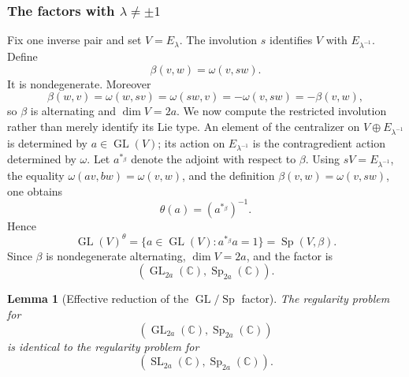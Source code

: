 \documentclass[11pt,reqno]{amsart}
\numberwithin{equation}{section}
\newtheorem{lemma}[theorem]{Lemma}
\theoremstyle{definition}
\theoremstyle{remark}
\newcommand{\C}{\mathbb C}
\newcommand{\GL}{\operatorname{GL}}
\newcommand{\SL}{\operatorname{SL}}
\newcommand{\Sp}{\operatorname{Sp}}
\begin{document}
\subsubsection{The factors with \texorpdfstring{\(\lambda\neq\pm1\)}{lambda not equal to +/-1}}

Fix one inverse pair and set \(V=E_\lambda\).  The involution \(s\)
identifies \(V\) with \(E_{\lambda^{-1}}\).  Define
\[
\beta(v,w)=\omega(v,sw).
\]
It is nondegenerate.  Moreover
\[
\beta(w,v)
=
\omega(w,sv)
=
\omega(sw,v)
=
-\omega(v,sw)
=
-\beta(v,w),
\]
so \(\beta\) is alternating and \(\dim V=2a\).
We now compute the restricted involution rather than merely identify its
Lie type.  An element of the centralizer on
\(V\oplus E_{\lambda^{-1}}\) is determined by \(a\in\GL(V)\); its action
on \(E_{\lambda^{-1}}\) is the contragredient action determined by
\(\omega\).  Let \(a^{*_{\beta}}\) denote the adjoint with respect to
\(\beta\).  Using \(sV=E_{\lambda^{-1}}\), the equality
\(\omega(av,bw)=\omega(v,w)\), and the definition
\(\beta(v,w)=\omega(v,sw)\), one obtains
\[
  \theta(a)=(a^{*_{\beta}})^{-1}.
\]
Hence
\[
  \GL(V)^\theta
  =\{a\in\GL(V):a^{*_{\beta}}a=1\}
  =\Sp(V,\beta).
\]
Since \(\beta\) is nondegenerate alternating, \(\dim V=2a\), and the
factor is
\[
  (\GL_{2a}(\C),\Sp_{2a}(\C)).
\]

\begin{lemma}[Effective reduction of the \(\GL/\Sp\) factor]
\label{cii:lem:GLSL}
The regularity problem for
\[
(\GL_{2a}(\C),\Sp_{2a}(\C))
\]
is identical to the regularity problem for
\[
(\SL_{2a}(\C),\Sp_{2a}(\C)).
\]
\end{lemma}
\end{document}
